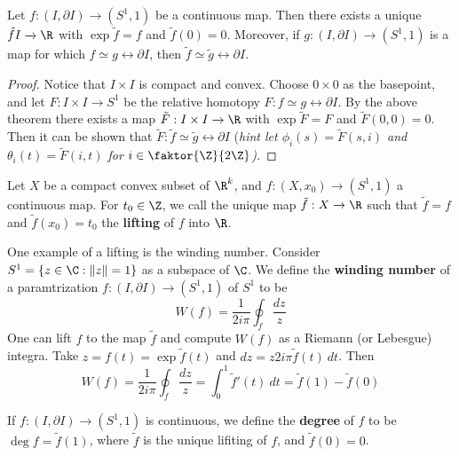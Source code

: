 \begin{corollary}
    Let $f:(I,\partial{I}) \xrightarrow{} (S^1,1)$ be a continuous map. Then
    there exists a unique $\tilde{f}I \xrightarrow{} \R$ with
    $\exp{\tilde{f}}=f$ and $\tilde{f}(0)=0$. Moreover, if $g:(I,\partial{I})
    \xrightarrow{} (S^1,1)$ is a map for which $f \simeq g \rel{\partial{I}}$,
    then  $\tilde{f} \simeq \tilde{g} \rel{\partial{I}}$.
\end{corollary}
\begin{proof}
    Notice that $I \times I$ is compact and convex. Choose  $0 \times 0$ as the
    basepoint, and let  $F:I \times I \xrightarrow{} S^1$ be the relative
    homotopy $F:f \simeq g \rel{\partial{I}}$. By the above theorem there exists
    a map $\tilde{F}:I \times I \xrightarrow{} \R$ with $\exp{\tilde{F}}=F$ and
    $\tilde{F}(0,0)=0$. Then it can be shown that $\tilde{F}:\tilde{f} \simeq
    \tilde{g} \rel{\partial{I}}$ (\it{hint} let $\phi_i(s)=\tilde{F}(s,i)$ and
    $\theta_i(t)=\tilde{F}(i,t)$ for $i \in \faktor{\Z}{2\Z}$).
\end{proof}

\begin{definition}
    Let $X$ be a compact convex subset of  $\R^k$, and  $f:(X,x_0)
    \xrightarrow{} (S^1,1)$ a continuous map. For $t_0 \in \Z$, we call the
    unique map $\tilde{f}:X \xrightarrow{} \R$ such that $\tilde{f}=f$ and
    $\tilde{f}(x_0)=t_0$ the \textbf{lifting} of $f$ into $\R$.
\end{definition}

\begin{example}\label{4.1}
    One example of a lifting is the winding number. Consider $S^1=\{z \in \C :
    \|z\|=1\}$ as a subspace of $\C$. We define the \textbf{winding number} of a
    paramtrization $f:(I,\partial{I}) \xrightarrow{} (S^1,1)$ of $S^1$ to be
    \begin{equation*}
        W(f)=\frac{1}{2i\pi}\oint_f{\frac{dz}{z}}
    \end{equation*}
    One can lift $f$ to the map $\tilde{f}$ and compute $W(f)$ as a Riemann (or
    Lebesgue) integra. Take $z=f(t)=\exp{\tilde{f}(t)}$ and
    $dz=z2i\pi\tilde{f}(t) \ dt$. Then
    \begin{equation*}
        W(f)=\frac{1}{2i\pi}\oint_f{\frac{dz}{z}}=\int_0^1{\tilde{f}'(t) \
        dt}=\tilde{f}(1)-\tilde{f}(0)
    \end{equation*}
\end{example}

\begin{definition}
    If $f:(I,\partial{I}) \xrightarrow{} (S^1,1)$ is continuous, we define the
    \textbf{degree} of $f$ to be  $\deg{f}=\tilde{f}(1)$, where $\tilde{f}$ is
    the unique lifiting of $f$, and  $\tilde{f}(0)=0$.
\end{definition}

